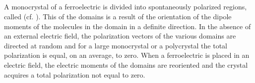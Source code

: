 \subsection{}\label{18.4.3} A monocrystal of a ferroelectric is divided into spontaneously polarized regions, called  (cf. ). This  of the domains is a result of the orientation of the dipole moments of the molecules in the domain in a definite direction. In the absence of an external electric field, the polarization vectors of the various domains are directed at random and for a large monocrystal or a polycrystal the total polarization is equal, on an average, to zero. When a ferroelectric is placed in an electric field, the electric moments of the domains are reoriented and the crystal acquires a total polarization not equal to zero.



